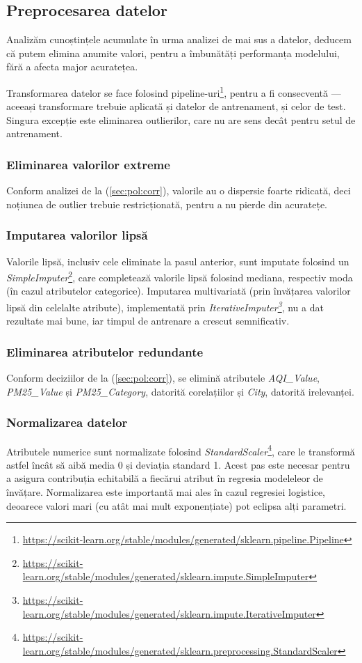 \documentclass{article}
\begin{document}
\subsection{Preprocesarea datelor}\label{sec:pol:preproc}
Analizăm cunoștințele acumulate în urma analizei de mai sus a datelor, deducem 
că putem elimina anumite valori, pentru a îmbunătăți performanța modelului, fără
a afecta major acuratețea.

Transformarea datelor se face folosind pipeline-uri\footnote{
    \url{https://scikit-learn.org/stable/modules/generated/sklearn.pipeline.Pipeline}
}, pentru a fi consecventă --- aceeași transformare trebuie aplicată și datelor 
de antrenament, și celor de test. Singura excepție este eliminarea outlierilor,
care nu are sens decât pentru setul de antrenament.

\subsubsection{Eliminarea valorilor extreme}
Conform analizei de la (\ref{sec:pol:corr}), valorile au o dispersie foarte 
ridicată, deci noțiunea de outlier trebuie restricționată, pentru a nu pierde 
din acuratețe. 

\subsubsection{Imputarea valorilor lipsă}
Valorile lipsă, inclusiv cele eliminate la pasul anterior, sunt imputate 
folosind un \textit{SimpleImputer}\footnote{
    \url{https://scikit-learn.org/stable/modules/generated/sklearn.impute.SimpleImputer}
}, care completează valorile lipsă folosind mediana, respectiv moda (în cazul 
atributelor categorice). Imputarea multivariată (prin învățarea valorilor lipsă
din celelalte atribute), implementată prin \textit{IterativeImputer\footnote{
    \url{https://scikit-learn.org/stable/modules/generated/sklearn.impute.IterativeImputer}
}}, nu a dat rezultate mai bune, iar timpul de antrenare a crescut semnificativ.

\subsubsection{Eliminarea atributelor redundante}
Conform deciziilor de la (\ref{sec:pol:corr}), se elimină atributele 
\textit{AQI\_Value}, \textit{PM25\_Value} și \textit{PM25\_Category}, datorită 
corelațiilor și \textit{City}, datorită irelevanței.

\subsubsection{Normalizarea datelor}
Atributele numerice sunt normalizate folosind \textit{StandardScaler}\footnote{
    \url{https://scikit-learn.org/stable/modules/generated/sklearn.preprocessing.StandardScaler}
}, care le transformă astfel încât să aibă media 0 și deviația standard 1. Acest
pas este necesar pentru a asigura contribuția echitabilă a fiecărui atribut în 
regresia modeleleor de învățare. Normalizarea este importantă mai ales în cazul
regresiei logistice, deoarece valori mari (cu atât mai mult exponențiate) pot
eclipsa alți parametri.
\end{document}
